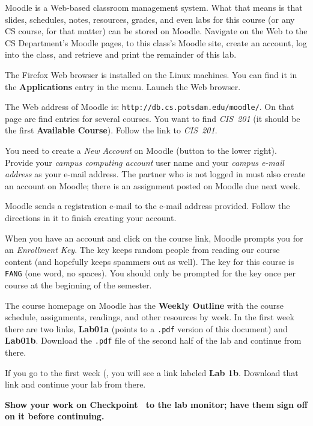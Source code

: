 \documentclass[12pt,twoside]{memoir}
\begin{document}
\begin{Exercise}[name={Checkpoint},title={Log into Moodle}]

  Moodle is a Web-based classroom management system. What that means
  is that slides, schedules, notes, resources, grades, and even labs
  for this course (or any CS course, for that matter) can be stored on
  Moodle. Navigate on the Web to the CS Department's Moodle pages,
  to this class's Moodle site, create an account, log into
  the class, and retrieve and print the remainder of this lab.

  The Firefox Web browser is installed on the Linux machines. You can
  find it in the \textbf{Applications} entry in the menu. Launch the
  Web browser.

  The Web address of Moodle is:
  \texttt{http://db.cs.potsdam.edu/moodle/}. On that page are
  find entries for several courses. You want to find \emph{CIS~201}
  (it should be the first \textbf{Available Course}). Follow the link
  to \emph{CIS~201}.

  You need to create a \emph{New Account} on Moodle (button to the
  lower right). Provide your \emph{campus computing account} user name
  and your \emph{campus e-mail address} as your e-mail address. The
  partner who is not logged in must also create an account on Moodle;
  there is an assignment posted on Moodle due next week.

  Moodle sends a registration e-mail to the e-mail address
  provided. Follow the directions in it to finish creating your
  account.

  When you have an account and click on the course link, Moodle
  prompts you for an \emph{Enrollment Key}. The key keeps random
  people from reading our course content (and hopefully keeps spammers
  out as well). The key for this course is \texttt{FANG} (one word, no
  spaces). You should only be prompted for the key once per course at
  the beginning of the semester.

  The course homepage on Moodle has the  \textbf{Weekly
    Outline} with the course schedule, assignments, readings, and
  other resources by week. In the first week there are two links,
  \textbf{Lab01a} (points to a \texttt{.pdf} version of this document)
  and \textbf{Lab01b}. Download the \texttt{.pdf} file of the second
  half of the lab and continue from there. 

  If you go to the first week (, you will see a
  link labeled \textbf{Lab 1b}. Download that link and continue your
  lab from there.
\end{Exercise}
\noindent
\textbf{Show your work on Checkpoint~\theExercise{} to the lab monitor;
  have them sign off on it before continuing.}
\end{document}
